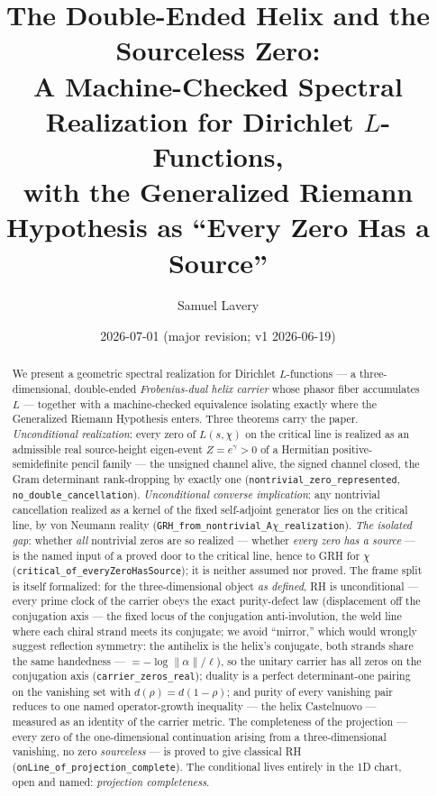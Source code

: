 \documentclass[11pt]{article}
\title{The Double-Ended Helix and the Sourceless Zero:\\
A Machine-Checked Spectral Realization for Dirichlet $L$-Functions,\\
with the Generalized Riemann Hypothesis as ``Every Zero Has a Source''}
\author{Samuel Lavery}
\date{2026-07-01 (major revision; v1 2026-06-19)}
\newcommand{\code}[1]{\texttt{#1}}
\begin{document}
\maketitle

\begin{abstract}
We present a geometric spectral realization for Dirichlet $L$-functions --- a three-dimensional,
double-ended \emph{Frobenius-dual helix carrier} whose phasor fiber accumulates $L$ --- together
with a machine-checked equivalence isolating exactly where the Generalized Riemann Hypothesis
enters.  Three theorems carry the paper.  \emph{Unconditional realization}: every zero of
$L(s,\chi)$ on the critical line is realized as an admissible real source-height eigen-event
$Z=e^{\gamma}>0$ of a Hermitian positive-semidefinite pencil family --- the unsigned channel alive,
the signed channel closed, the Gram determinant rank-dropping by exactly one
(\code{nontrivial\_zero\_represented}, \code{no\_double\_cancellation}).  \emph{Unconditional
converse implication}: any nontrivial cancellation realized as a kernel of the fixed self-adjoint
generator lies on the critical line, by von Neumann reality
(\code{GRH\_from\_nontrivial\_A$\chi$\_realization}).  \emph{The isolated gap}: whether \emph{all}
nontrivial zeros are so realized --- whether \emph{every zero has a source} --- is the named
input of a proved door to the critical line, hence to GRH for $\chi$
(\code{critical\_of\_everyZeroHasSource}); it is neither assumed nor proved.  The frame split is
itself formalized: for the three-dimensional object \emph{as defined}, RH is unconditional ---
every prime clock of the carrier obeys the exact purity-defect law (displacement off the
conjugation axis --- the fixed locus of the conjugation anti-involution, the weld line where each
chiral strand meets its conjugate; we avoid ``mirror,'' which would wrongly suggest reflection
symmetry: the antihelix is the helix's conjugate, both strands share the same handedness ---
$=-\log\|\alpha\|/\ell$), so the unitary carrier has all zeros on the conjugation axis
(\code{carrier\_zeros\_real}); duality is a perfect determinant-one pairing on the vanishing set
with $d(\rho)=d(1-\rho)$; and purity of every vanishing pair reduces to one named operator-growth
inequality --- the helix Castelnuovo --- measured as an identity of the carrier metric.  The
completeness of the projection --- every zero of the one-dimensional continuation arising from a
three-dimensional vanishing, no zero \emph{sourceless} --- is proved to give classical RH
(\code{onLine\_of\_projection\_complete}).  The conditional lives
entirely in the 1D chart, open and named: \emph{projection completeness}.


\end{abstract}
\end{document}

